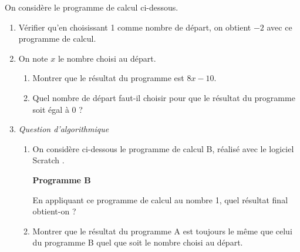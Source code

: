 On considère le programme de calcul ci-dessous.

\begin{center}
\end{center}

\begin{enumerate}
	\item Vérifier qu'en choisissant 1 comme nombre de départ, on obtient $-2$ avec ce programme de calcul.

	\item On note $x$ le nombre choisi au départ.
	\begin{enumerate}
		\item Montrer que le résultat du programme est $8x - 10$.

		\item Quel nombre de départ faut-il choisir pour que le résultat du programme soit égal à 0 ?
	\end{enumerate}

	\item \emph{Question d'algorithmique}
	\begin{enumerate}
		\item On considère ci-dessous le programme de calcul B, réalisé avec le logiciel \og Scratch \fg.

		\begin{center}
				\centering \textbf{Programme B}\\[6pt]

				\begin{scratch}
				\end{scratch}
		\end{center}

		En appliquant ce programme de calcul au nombre 1, quel résultat final obtient-on ?

		\item Montrer que le résultat du programme A est toujours le même que celui du programme B quel que soit le nombre choisi au départ.
	\end{enumerate}
\end{enumerate}

